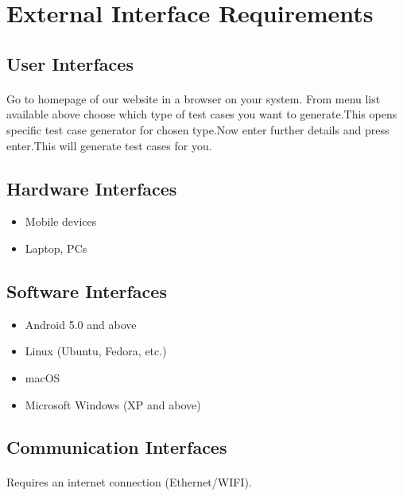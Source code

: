 \documentclass{article}
\begin{document}
\section{External Interface Requirements}
\subsection{User Interfaces}
\paragraph{}
Go to homepage of our website in a browser on your system. From menu list available
above choose which type of test cases you want to generate.This opens specific test
case generator for chosen type.Now enter further details and press enter.This will
generate test cases for you.

\subsection{Hardware Interfaces}
\begin{itemize}
    \item Mobile devices
    \item Laptop, PCs
\end{itemize}

\subsection{Software Interfaces}
\begin{itemize}
    \item Android 5.0 and above
    \item Linux (Ubuntu, Fedora, etc.)
    \item macOS
    \item Microsoft Windows (XP and above)
\end{itemize}

\subsection{Communication Interfaces}
\paragraph{}
Requires an internet connection (Ethernet/WIFI).
\end{document}
